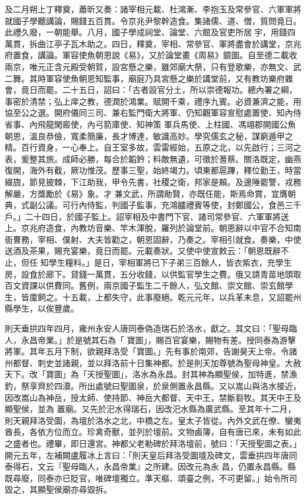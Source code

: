 \begin{pinyinscope}
 及二月朔上丁釋奠，蕭昕又奏：諸宰相元載、杜鴻漸、李抱玉及常參官、六軍軍將就國子學聽講論，賜錢五百貫。令京兆尹黎幹造食。集諸儒、道、僧，質問竟日。此禮久廢，一朝能舉。八月，國子學成祠堂、論堂、六館及官吏所居宇，用錢四萬貫，拆曲江亭子瓦木助之。四日，釋奠，宰相、常參官、軍將盡會於講堂，京兆府置食，講論。軍容使魚朝恩說《易》，又於論堂畫《周易》鏡圖。自至德二載收
 兩京，唯元正含元殿受朝賀，設宮懸之樂，雖郊廟大祭，只有登歌樂，亦無文、武二舞。其時軍容使魚朝恩知監事，廟庭乃具宮懸之樂於講堂前，又有教坊樂府雜會，竟日而罷。二十五日，詔曰：「古者設官分土，所以崇德報功。總內署之綱，事密於清禁；弘上庠之教，德潤於鴻業。賦開千乘，禮序九賓。必資兼濟之能，用協至公之選。開府儀同三司、兼右監門衛大將軍、仍知觀軍容宣慰處置使、知內侍省事、內飛龍閑廄使，內弓箭庫使、知神策
 軍兵馬使、上柱國、馮翊郡開國公魚朝恩，溫良恭儉，寬柔簡廉，長才博達，敏識高妙。學究儒玄之秘，謀窮遁甲之精。百行資身，一心奉上。自王室多故，雲雷經始，五原之北，以先啟行；三河之表，爰整其旅。成師必勝，每合於韜鈐；料敵無遺，可徵於蓍蔡。關洛既定，幽燕復開，海外有截，厥功惟茂。歷事三聖，始終竭力。頃東都扈蹕，釋位勤王，時當綴旒，節見披棘，下江助我，甲令先書，社稷之衛，邦家是賴。及邊陲罷警，戎務解嚴，方獎勵於《易》象。才
 兼文武，所謂勛賢，亦既任能，斯焉命賞，宜膺朝典，式副公議。可行內侍監，判國子監事，充鴻臚禮賓等使，封鄭國公，食邑三千戶。」二十四日，於國子監上。詔宰相及中書門下官、諸司常參官、六軍軍將送上。京兆府造食，內教坊音樂、竿木渾脫，羅列於論堂前。朝恩辭以中官不合知南衙曹務，宰相、僕射、大夫皆勸之，朝恩固辭，乃奏之。宰相引就食。奏樂，中使送酒及茶果，賜充宴樂，竟日而罷。元載奏狀。又使中使宣敕云：「朝恩既辭不止，但任
 知學生糧料。」是日，宰相軍將已下子弟三百餘人，皆衣紫衣，充學生房，設食於廊下。貸錢一萬貫，五分收錢，以供監官學生之費。俄又請青苗地頭取百文資課以供費同。舊例，兩京國子監生二千餘人，弘文館、崇文館、崇玄館學生，皆廩飼之。十五載，上都失守，此事廢絕。乾元元年，以兵革未息，又詔罷州縣學生，以俟豐歲。



 則天垂拱四年四月，雍州永安人唐同泰偽造瑞石於洛水，獻之。其文曰：「聖母臨人，永昌帝業。」於是號其石為「
 寶圖」，賜百官宴樂，賜物有差。授同泰為游擊將軍。其年五月下制，欲親拜洛受「寶圖。」先有事於南郊，告謝昊天上帝。令諸州都督、刺史並諸親，並以拜洛前十日集神都。於是則天加尊號為聖母神皇。大赦天下。改「寶圖」為「天授聖圖」，洛水為永昌。封其神為顯聖侯，加特進，禁漁釣，祭享齊於四瀆。所出處號曰聖圖泉，於泉側置永昌縣。又以嵩山與洛水接近，因改嵩山為神岳，授太師、使持節、神岳大都督、天中王，禁斷芻牧。其天中王及顯聖侯，並為
 置廟。又先於汜水得瑞石，因改汜水縣為廣武縣。至其年十二月，則天親拜洛受圖，為壇於洛水之北，中橋之左。皇太子皆從。內外文武在僚、蠻夷酋長，各依方位而立。珍禽奇獸，並列於壇前。文物鹵簿，自有唐已來，未有如此之盛者也。禮畢，即日還宮。神都父老勒碑於拜洛壇前，號曰：「天授聖圖之表。」開元五年，左補闕盧履冰上言曰：「則天皇后拜洛受圖壇及碑文，雲垂拱四年唐同泰得石，文云『聖母臨人，永昌帝業』之所建。因改元為永
 昌，仍置永昌縣。縣既尋廢，同泰亦已貶官，唯碑壇獨立。準天樞、頌臺之例，不可更留。」始令所司毀之，其顯聖侯廟亦尋毀拆。




\end{pinyinscope}
